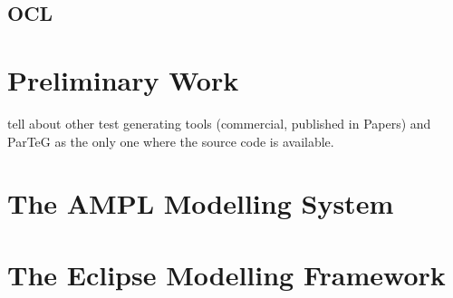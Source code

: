 \subsection{OCL}

\section{Preliminary Work}
tell about other test generating tools (commercial, published in Papers) and ParTeG as the only one where the source code is available.\cite{ParTeG}

\section{The AMPL Modelling System}
\cite{AMPL}
\section{The Eclipse Modelling Framework}
\cite{EMF}
